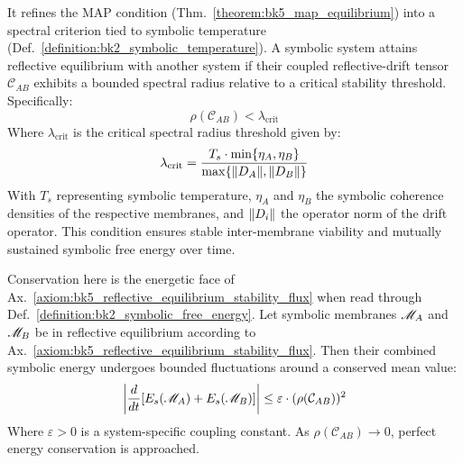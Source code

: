 \begin{axiom}
\label{axiom:bk5_reflective_equilibrium_stability_flux}
It refines the MAP condition (Thm.~\ref{theorem:bk5_map_equilibrium}) into a spectral criterion tied to symbolic temperature (Def.~\ref{definition:bk2_symbolic_temperature}).
A symbolic system attains reflective equilibrium with another system if their coupled reflective-drift tensor $\mathcal{C}_{AB}$ exhibits a bounded spectral radius relative to a critical stability threshold. Specifically:
\begin{equation}
\rho(\mathcal{C}_{AB}) < \lambda_{\text{crit}}
\end{equation}
Where $\lambda_{\text{crit}}$ is the critical spectral radius threshold given by:
\begin{equation}
\lambda_{\text{crit}} = \frac{T_s \cdot \min\{\eta_A, \eta_B\}}{\max\{\|D_A\|, \|D_B\|\}} 
\end{equation}
With $T_s$ representing symbolic temperature, $\eta_A$ and $\eta_B$ the symbolic coherence densities of the respective membranes, and $\|D_i\|$ the operator norm of the drift operator.
This condition ensures stable inter-membrane viability and mutually sustained symbolic free energy over time.
\end{axiom}
\begin{theorem} \label{theorem:bk5_reflective_equilibrium_conservation}
Conservation here is the energetic face of Ax.~\ref{axiom:bk5_reflective_equilibrium_stability_flux} when read through Def.~\ref{definition:bk2_symbolic_free_energy}.
Let symbolic membranes $\mathscr{M}_A$ and $\mathscr{M}_B$ be in reflective equilibrium according to Ax.~\ref{axiom:bk5_reflective_equilibrium_stability_flux}. Then their combined symbolic energy undergoes bounded fluctuations around a conserved mean value:
\begin{equation}
\left| \frac{d}{dt}[E_s(\mathscr{M}_A) + E_s(\mathscr{M}_B)] \right| \leq \varepsilon \cdot (\rho(\mathcal{C}_{AB}))^2
\end{equation}
Where $\varepsilon > 0$ is a system-specific coupling constant. As $\rho(\mathcal{C}_{AB}) \to 0$, perfect energy conservation is approached.
\end{theorem}
